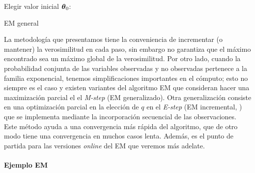 \begin{algorithm}[H]\label{algo:general_EM}
    Elegir valor inicial $\mbox{\boldmath$ \theta $}_0$: \\
\caption{EM general}
\end{algorithm}

La metodología que presentamos tiene la conveniencia de incrementar (o mantener) la verosimilitud en cada paso, sin embargo no garantiza que el máximo encontrado sea un máximo global de la verosimilitud. Por otro lado, cuando la probabilidad conjunta de las variables observadas y no observadas pertenece a la familia exponencial, tenemos simplificaciones importantes en el cómputo; esto no siempre es el caso y existen variantes del algoritmo EM que consideran hacer una maximización parcial el el \textit{M-step} (EM generalizado). Otra generalización consiste en una optimización parcial en la elección de $q$ en el \textit{E-step} (EM incremental, \cite{Neal1998}) que se implementa mediante la incorporación secuencial de las observaciones. Este método ayuda a una convergencia más rápida del algoritmo, que de otro modo tiene una convergencia en muchos casos lenta. Además, es el punto de partida para las versiones \textit{online} del EM que veremos más adelate.

\paragraph{Ejemplo EM}

